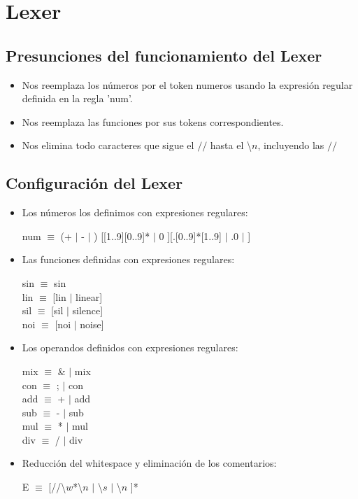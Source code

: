 \documentclass[a4paper]{article}
\begin{document}
\section{Lexer}

\subsection{Presunciones del funcionamiento del Lexer }
\begin{itemize}
\item Nos reemplaza los números por el token numeros usando la expresión regular definida en la regla 'num'.
\item Nos reemplaza las funciones por sus tokens correspondientes.
\item Nos elimina todo caracteres que sigue el $//$ hasta el \textbackslash$n$, incluyendo las $//$
\end{itemize}

\subsection{Configuración del Lexer }
\begin{itemize}

\item Los números los definimos con expresiones regulares:
\begin{center}
num $\equiv$ (+ $|$ - $|$ ) [[1..9][0..9]* $|$ 0 ][.[0..9]*[1..9] $|$ .0 $|$ ]
\end{center}

\item Las funciones definidas con expresiones regulares:
\begin{center}
sin $\equiv$ sin \\ 						
lin $\equiv$ [lin $|$ linear] \\
sil $\equiv$ [sil $|$ silence] \\
noi $\equiv$ [noi $|$ noise] \\
\end{center}

\item Los operandos definidos con expresiones regulares:
\begin{center}
mix $\equiv$ \& $|$ mix \\
con $\equiv$ ; $|$ con \\
add $\equiv$ + $|$ add \\
sub $\equiv$ - $|$ sub \\
mul $\equiv$ * $|$ mul \\
div $\equiv$ / $|$ div
\end{center}

\item Reducción del whitespace y eliminación de los comentarios:

\begin{center}
E $\equiv$ [//\textbackslash$w$*\textbackslash$n$ $|$ \textbackslash$s$ $|$ \textbackslash$n$ ]*  
\end{center}

\end{itemize}
\end{document}
